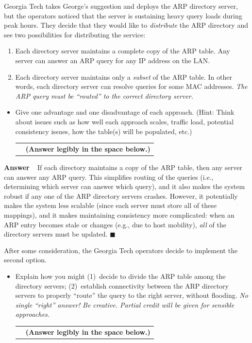 \documentclass[11pt]{article}
\newcounter{pctr}
\newcommand{\ansbelow}{\probnote{Answer legibly in the space below.}}
\newcommand{\sols}[1]{#1}
\newcommand{\sols}[1]{}
\newcounter{answer}
\newenvironment{answer}[1][\relax]{\refstepcounter{answer}\begin{list}%
 {}{\leftmargin 0pt\rightmargin 0pt\labelsep 3pt\parsep 0pt%
 \setlength{\listparindent}{\parindent}}
    \item {\bf Answer \theanswer #1}\
    }{\hspace*{\fill}$\blacksquare$\end{list}}
\newcommand\prob[1]%
  {\begin{itemize}\item[]%
   \vspace{.2in}{\bf\thepctr. ~[#1~ points]:}\stepcounter{pctr}}
\newcommand\eprob{\end{itemize}}
\newcommand\probnote[1]%
  {\\\begin{tabular}{cr} \hspace{3in} & {\bf (#1)} \\ \end{tabular}}
\begin{document}
\newpage
Georgia Tech takes George's suggestion and deploys the ARP directory
server, but the operators noticed that the server is sustaining heavy
query loads during peak hours.  They decide that they would like to {\em
distribute} the ARP directory and see two possibilities for distributing
the service:
\begin{enumerate}
\itemsep=-1pt
\item Each directory server maintains a complete copy of
  the ARP table.  Any server can answer an ARP query for any IP address
  on the LAN.
\item Each directory server maintains only a {\em subset} of the ARP
  table.  In other words, each directory server can resolve queries for
  some MAC addresses. {\em The ARP query must be ``routed'' to the
    correct directory server.}
\end{enumerate}

\prob{4} 
Give one advantage and one disadvantage of each approach.  (Hint:
Think about issues such as how well each approach scales, traffic load,
potential consistency issues, how the table(s) will be populated, etc.)
~\ansbelow
\vspace{1.25in}
\eprob

\sols{
\vspace{-1in}
\begin{answer}
If each directory maintains a copy of the ARP table, then any server can
answer any ARP query.  This simplifies routing of the queries (i.e.,
determining which server can answer which query), and it also makes the
system robust if any one of the ARP directory servers crashes.  However,
it potentially makes the system less scalable (since each server must
store all of these mappings), and it makes maintaining consistency more
complicated: when an ARP entry becomes stale or changes (e.g., due to
host mobility), {\em all} of the directory servers must be updated.
\end{answer}
}

After some consideration, the Georgia Tech operators decide to implement
the second option.  

\prob{6} Explain how you might (1)~decide to divide the ARP table among
the directory servers; (2)~establish connectivity between the ARP
directory servers to properly ``route'' the query to the right server,
without flooding. {\em No single ``right'' answer!  Be creative.
  Partial credit will be given for sensible approaches.}  ~\ansbelow
\vspace{1.25in}
\eprob
\end{document}
